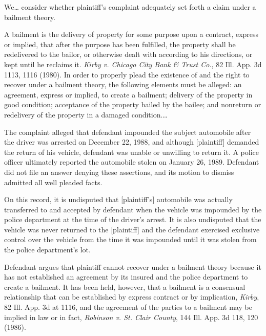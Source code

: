 We\ldots
consider whether plaintiff's complaint adequately set forth a claim
under a bailment theory.

A bailment is the delivery of property for some purpose upon a contract, express
or implied, that after the purpose has been fulfilled, the property shall be
redelivered to the bailor, or otherwise dealt with according to his directions,
or kept until he reclaims it. \textit{Kirby v. Chicago City Bank \& Trust Co.},
82 Ill. App. 3d 1113, 1116 (1980).
In order to properly plead the existence of and the right to recover under a
bailment theory, the following elements must be alleged: an agreement, express
or implied, to create a bailment; delivery of the property in good condition;
acceptance of the property bailed by the bailee; and nonreturn or redelivery of
the property in a damaged condition.\ldots

The complaint alleged that defendant impounded the subject automobile after the
driver was arrested on December 22, 1988, and although [plaintiff]
demanded the return of his vehicle, defendant was unable or unwilling to return
it. A police officer ultimately reported the automobile stolen on January 26,
1989. Defendant did not file an answer denying these assertions, and its motion
to dismiss admitted all well pleaded facts.

On this record, it is undisputed that [plaintiff's] automobile
was actually transferred to and accepted by defendant when the vehicle was
impounded by the police department at the time of the driver's arrest. It is
also undisputed that the vehicle was never returned to the [plaintiff]
and the defendant exercised exclusive control over the vehicle from the time it
was impounded until it was stolen from the police department's lot.

Defendant argues that plaintiff cannot recover under a bailment theory because
it has not established an agreement by its insured and the police department to
create a bailment. It has been held, however, that a bailment is a consensual
relationship that can be established by express contract or by implication,
\textit{Kirby}, 82 Ill. App. 3d at 1116,
and the agreement of the parties to a bailment may be implied
in law or in fact, \textit{Robinson
v. St. Clair County}, 144 Ill. App. 3d 118, 120 (1986).

